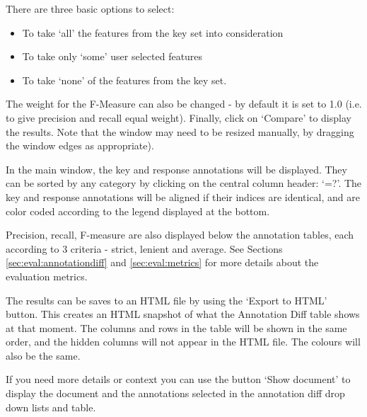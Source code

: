 There are three basic options to select:
\begin{itemize}
\item
To take `all' the features from the key set into consideration
\item
To take only `some' user selected features
\item
To take `none' of the features from the key set.
\end{itemize}

The weight for the F-Measure can also be changed - by default it is set to
1.0 (i.e. to give precision and recall equal weight). Finally, click on
`Compare' to display the results. Note that the window may need to be
resized manually, by dragging the window edges as appropriate).

In the main window, the key and response annotations will be
displayed. They can be sorted by any category by clicking on the
central column header: `=?'. The key and response annotations will be
aligned if their indices are identical, and are color coded
according to the legend displayed at the bottom.

Precision, recall, F-measure are also displayed below the annotation tables,
each according to 3 criteria - strict, lenient and average. See Sections
\ref{sec:eval:annotationdiff} and \ref{sec:eval:metrics} for more
details about the evaluation metrics.

The results can be saves to an HTML file by using the `Export to
HTML' button. This creates an HTML snapshot of what the Annotation Diff
table shows at that moment. The columns and rows in the table will
be shown in the same order, and the hidden columns will not appear in
the HTML file. The colours will also be the same.

If you need more details or context you can use the button `Show document'
to display the document and the annotations selected in the annotation diff
drop down lists and table.


